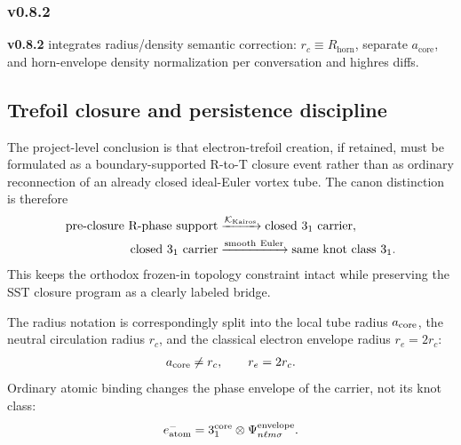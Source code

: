 \documentclass[11pt]{article}
\theoremstyle{definition}
\theoremstyle{plain}
\theoremstyle{remark}
\newcommand{\rc}{{r_c}}
\begin{document}
        \subsubsection{v0.8.2}
            \textbf{v0.8.2} integrates radius/density semantic correction: $\rc \equiv R_{\mathrm{horn}}$, separate $a_{\mathrm{core}}$, and horn-envelope density normalization per conversation and highres diffs.


        \subsection{Trefoil closure and persistence discipline}
            The project-level conclusion is that electron-trefoil creation, if
            retained, must be formulated as a boundary-supported R-to-T closure
            event rather than as ordinary reconnection of an already closed
            ideal-Euler vortex tube. The canon distinction is therefore
            \begin{align}
                \text{pre-closure R-phase support}
                &\xrightarrow{\mathcal{K}_{\rm Kairos}}
                \text{closed }3_1\text{ carrier},\\
                \text{closed }3_1\text{ carrier}
                &\xrightarrow{\rm smooth\ Euler}
                \text{same knot class }3_1 .
            \end{align}
            This keeps the orthodox frozen-in topology constraint intact while
            preserving the SST closure program as a clearly labeled bridge.

            The radius notation is correspondingly split into the local tube
            radius \(a_{\rm core}\), the neutral circulation radius \(\rc\), and
            the classical electron envelope radius \(r_e=2\rc\):
            \begin{align}
                a_{\rm core} \neq \rc,
                \qquad
                r_e=2\rc .
            \end{align}
            Ordinary atomic binding changes the phase envelope of the carrier,
            not its knot class:
            \begin{align}
                e^-_{\rm atom}
                =
                3_1^{\rm core}\otimes\Psi_{n\ell m\sigma}^{\rm envelope} .
            \end{align}
\end{document}
